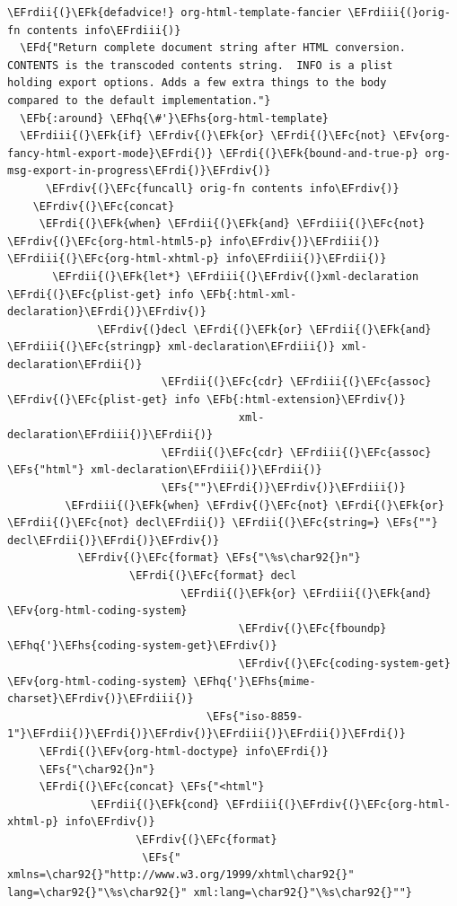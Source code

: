 \documentclass{scrartcl}
\newcommand{\EFk}[1]{\textcolor{EFk}{#1}} %
\newcommand{\EFd}[1]{\textcolor{EFd}{\textit{#1}}} %
\newcommand{\EFs}[1]{\textcolor{EFs}{#1}} %
\newcommand{\EFb}[1]{\textcolor{EFb}{#1}} %
\newcommand{\EFc}[1]{\textcolor{EFc}{#1}} %
\newcommand{\EFv}[1]{\textcolor{EFv}{#1}} %
\newcommand{\EFhq}[1]{\textcolor{EFhq}{#1}} %
\newcommand{\EFhs}[1]{\textcolor{EFhs}{#1}} %
\newcommand{\EFrdi}[1]{\textcolor{EFrdi}{#1}} %
\newcommand{\EFrdii}[1]{\textcolor{EFrdii}{#1}} %
\newcommand{\EFrdiii}[1]{\textcolor{EFrdiii}{#1}} %
\newcommand{\EFrdiv}[1]{\textcolor{EFrdiv}{#1}} %
\begin{document}
\begin{Code}
\begin{Verbatim}[]
\EFrdii{(}\EFk{defadvice!} org-html-template-fancier \EFrdiii{(}orig-fn contents info\EFrdiii{)}
  \EFd{"Return complete document string after HTML conversion.
CONTENTS is the transcoded contents string.  INFO is a plist
holding export options. Adds a few extra things to the body
compared to the default implementation."}
  \EFb{:around} \EFhq{\#'}\EFhs{org-html-template}
  \EFrdiii{(}\EFk{if} \EFrdiv{(}\EFk{or} \EFrdi{(}\EFc{not} \EFv{org-fancy-html-export-mode}\EFrdi{)} \EFrdi{(}\EFk{bound-and-true-p} org-msg-export-in-progress\EFrdi{)}\EFrdiv{)}
      \EFrdiv{(}\EFc{funcall} orig-fn contents info\EFrdiv{)}
    \EFrdiv{(}\EFc{concat}
     \EFrdi{(}\EFk{when} \EFrdii{(}\EFk{and} \EFrdiii{(}\EFc{not} \EFrdiv{(}\EFc{org-html-html5-p} info\EFrdiv{)}\EFrdiii{)} \EFrdiii{(}\EFc{org-html-xhtml-p} info\EFrdiii{)}\EFrdii{)}
       \EFrdii{(}\EFk{let*} \EFrdiii{(}\EFrdiv{(}xml-declaration \EFrdi{(}\EFc{plist-get} info \EFb{:html-xml-declaration}\EFrdi{)}\EFrdiv{)}
              \EFrdiv{(}decl \EFrdi{(}\EFk{or} \EFrdii{(}\EFk{and} \EFrdiii{(}\EFc{stringp} xml-declaration\EFrdiii{)} xml-declaration\EFrdii{)}
                        \EFrdii{(}\EFc{cdr} \EFrdiii{(}\EFc{assoc} \EFrdiv{(}\EFc{plist-get} info \EFb{:html-extension}\EFrdiv{)}
                                    xml-declaration\EFrdiii{)}\EFrdii{)}
                        \EFrdii{(}\EFc{cdr} \EFrdiii{(}\EFc{assoc} \EFs{"html"} xml-declaration\EFrdiii{)}\EFrdii{)}
                        \EFs{""}\EFrdi{)}\EFrdiv{)}\EFrdiii{)}
         \EFrdiii{(}\EFk{when} \EFrdiv{(}\EFc{not} \EFrdi{(}\EFk{or} \EFrdii{(}\EFc{not} decl\EFrdii{)} \EFrdii{(}\EFc{string=} \EFs{""} decl\EFrdii{)}\EFrdi{)}\EFrdiv{)}
           \EFrdiv{(}\EFc{format} \EFs{"\%s\char92{}n"}
                   \EFrdi{(}\EFc{format} decl
                           \EFrdii{(}\EFk{or} \EFrdiii{(}\EFk{and} \EFv{org-html-coding-system}
                                    \EFrdiv{(}\EFc{fboundp} \EFhq{'}\EFhs{coding-system-get}\EFrdiv{)}
                                    \EFrdiv{(}\EFc{coding-system-get} \EFv{org-html-coding-system} \EFhq{'}\EFhs{mime-charset}\EFrdiv{)}\EFrdiii{)}
                               \EFs{"iso-8859-1"}\EFrdii{)}\EFrdi{)}\EFrdiv{)}\EFrdiii{)}\EFrdii{)}\EFrdi{)}
     \EFrdi{(}\EFv{org-html-doctype} info\EFrdi{)}
     \EFs{"\char92{}n"}
     \EFrdi{(}\EFc{concat} \EFs{"<html"}
             \EFrdii{(}\EFk{cond} \EFrdiii{(}\EFrdiv{(}\EFc{org-html-xhtml-p} info\EFrdiv{)}
                    \EFrdiv{(}\EFc{format}
                     \EFs{" xmlns=\char92{}"http://www.w3.org/1999/xhtml\char92{}" lang=\char92{}"\%s\char92{}" xml:lang=\char92{}"\%s\char92{}""}

\end{Verbatim}
\end{Code}
\end{document}
